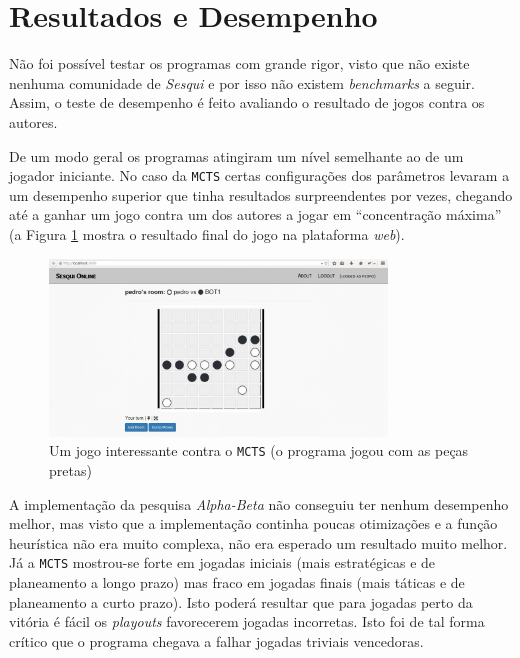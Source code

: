 \documentclass[12pt,a4paper,oneside]{article}
\begin{document}

\section{Resultados e Desempenho}
\label{sec:resdes}

Não foi possível testar os programas com grande rigor, visto que não
existe nenhuma comunidade de \textit{Sesqui} e por isso não existem
\textit{benchmarks} a seguir. Assim, o teste de desempenho é feito
avaliando o resultado de jogos contra os autores.

De um modo geral os programas atingiram um nível semelhante ao de um
jogador iniciante. No caso da \texttt{MCTS} certas configurações dos
parâmetros levaram a um desempenho superior que tinha resultados
surpreendentes por vezes, chegando até a ganhar um jogo contra um dos
autores a jogar em ``concentração máxima'' (a Figura \ref{fig:mctswin}
mostra o resultado final do jogo na plataforma \textit{web}).

\begin{figure}[!htb]
  \centering
  \includegraphics[width=0.8\textwidth]{sesqui_win}
  \caption{Um jogo interessante contra o \texttt{MCTS} (o programa jogou com as peças pretas)}
  \label{fig:mctswin}
\end{figure}

A implementação da pesquisa \textit{Alpha-Beta} não conseguiu ter nenhum
desempenho melhor, mas visto que a implementação continha poucas
otimizações e a função heurística não era muito complexa, não era
esperado um resultado muito melhor. Já a \texttt{MCTS} mostrou-se
forte em jogadas iniciais (mais estratégicas e de planeamento a longo
prazo) mas fraco em jogadas finais (mais táticas e de planeamento a
curto prazo). Isto poderá resultar que para jogadas perto da vitória é
fácil os \textit{playouts} favorecerem jogadas incorretas. Isto foi de
tal forma crítico que o programa chegava a falhar jogadas triviais
vencedoras.
\end{document}
